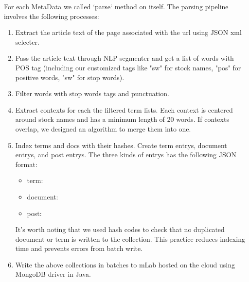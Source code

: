 \documentclass{article}
\begin{document}
For each MetaData we called `parse` method on itself. The parsing pipeline involves the following processes:
\begin{enumerate}
  \item Extract the article text of the page associated with the url using JSON xml selecter.
  \item Pass the article text through NLP segmenter and get a list of words with POS tag (including our customized tags like "sw" for stock names, "pos" for positive words, "sw" for stop words).
  \item Filter words with stop words tags and punctuation.
  \item Extract contexts for each the filtered term lists. Each context is centered around stock names and has a minimum length of 20 words. If contexts overlap, we designed an algorithm to merge them into one.
  \item Index terms and docs with their hashes. Create term entrys, document entrys, and post entrys. The three kinds of entrys has the following JSON format:
  \begin{itemize}
    \item term: \par
      \texttt{} \par
    \item document:\par
      \texttt{} \par
      \texttt{} \par
      \texttt{} \par
      \texttt{}\par
    \item post:\par
      \texttt{}\par
      \texttt{}
  \end{itemize}
  It's worth noting that we used hash codes to check that no duplicated document or term is written to the collection. This practice reduces indexing time and prevents errors from batch write.
  \item Write the above collections in batches to mLab hosted on the cloud using MongoDB driver in Java. 
\end{enumerate}
\end{document}
